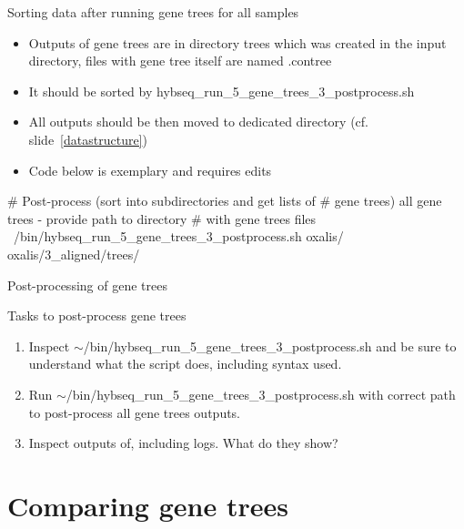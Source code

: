 \documentclass[compress, ucs, xelatex, 11pt, xcolor=x11names, aspectratio=1609,
	hyperref={
		bookmarks=true,
		unicode=true,
		colorlinks=true,
		pdftitle={HybSeq course},
		plainpages=false,
		pdfauthor={Vojtech Zeisek},
		pdfsubject={Practical processing of HybSeq target enrichment sequencing data on computing grids like MetaCentrum},
		pdfcreator={XeLaTeX},
		pdfkeywords={BASH, command line, GNU, HybSeq, Linux, MetaCentrum, sequencing shell, target enrichment},
		linkcolor=Cyan2, %
		anchorcolor=Firebrick2, %
		citecolor=Firebrick2, %
		filecolor=Firebrick2, %
		menucolor=Firebrick2, %
		urlcolor=Chartreuse2, %
		pdftex},
	url={hyphens, lowtilde} %
	]{beamer}
\renewcommand{\texttt}[1]{\colorbox{Snow4}{{\ttfamily #1}}}
\renewcommand{\alert}[1]{\textcolor{OrangeRed2}{#1}}
\begin{document}
\begin{frame}[fragile]{Sorting data after running gene trees for all samples}
	\begin{itemize}
		\item Outputs of gene trees are in directory \texttt{trees} which was created in the input directory, files with gene tree itself are named \texttt{*.contree}
		\item It should be sorted by \texttt{hybseq\_run\_5\_gene\_trees\_3\_postprocess.sh}
		\item All outputs should be then moved to dedicated directory (cf. slide~\ref{datastructure})
		\item \alert{Code below is exemplary and requires edits}
	\end{itemize}
	\begin{bashcode}
    # Post-process (sort into subdirectories and get lists of
    # gene trees) all gene trees - provide path to directory
    # with gene trees files
    ~/bin/hybseq_run_5_gene_trees_3_postprocess.sh oxalis/
      oxalis/3_aligned/trees/
	\end{bashcode}
\end{frame}

\begin{frame}{Post-processing of gene trees}
	\begin{exampleblock}{Tasks to post-process gene trees}
		\begin{enumerate}
			\item Inspect \texttt{$\sim$/bin/hybseq\_run\_5\_gene\_trees\_3\_postprocess.sh} and be sure to understand what the script does, including syntax used.
			\item Run \texttt{$\sim$/bin/hybseq\_run\_5\_gene\_trees\_3\_postprocess.sh}  with correct path to post-process all gene trees outputs.
			\item Inspect outputs of, including logs. What do they show?
		\end{enumerate}
	\end{exampleblock}
\end{frame}

\section{Comparing gene trees}
\end{document}
